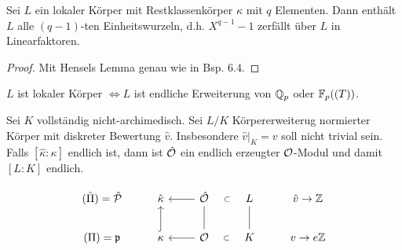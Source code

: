 
\begin{Bem}
Sei $L$ ein lokaler Körper mit Restklassenkörper $\kappa$ mit $q$ Elementen. Dann enthält $L$ alle $(q-1)$-ten Einheitswurzeln, d.h. $X^{q-1}-1$ zerfällt über $L$ in Linearfaktoren.
\end{Bem}

\begin{proof}
Mit Hensels Lemma genau wie in Bsp. 6.4.
\end{proof}

\begin{Satz}
$L$ ist lokaler Körper $\iff L$ ist endliche Erweiterung von $\mathbb{Q}_p$ oder $\mathbb{F}_p((T))$.
\end{Satz}

\begin{Lem}
Sei $K$ vollständig nicht-archimedisch. Sei $L/K$ Körpererweiterug normierter Körper mit diskreter Bewertung $\hat v$. Insbesondere $\hat v|_K=v$ soll nicht trivial sein.
Falls $[\hat \kappa: \kappa]$ endlich ist, dann ist $\hat{\mathcal{O}}$ ein endlich erzeugter $\mathcal{O}$-Modul und damit $[L:K]$ endlich.
\end{Lem}

\[\begin{tikzcd}
(\hat \Pi)=\hP & \hat \kappa & \hO \arrow[l] \arrow[draw=none]{r}[auto=false, sloped]{\subset} & L & \hat v \to \Z\\
(\Pi)=\p & \kappa \arrow[hook]{u} & \O \arrow[dash]{u} \arrow[l] \arrow[draw=none]{r}[auto=false, sloped]{\subset} & K \arrow[dash]{u} &  v \to e\Z
\end{tikzcd}\]


